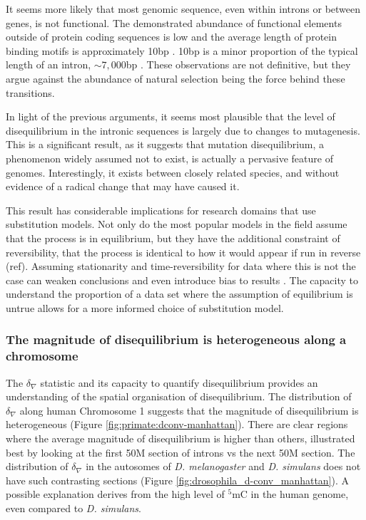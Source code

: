 It seems more likely that most genomic sequence, even within introns or between genes, is not functional. The demonstrated abundance of functional elements outside of protein coding sequences is low \citep{Graur2013OnENCODE} and the average length of protein binding motifs is approximately 10bp \citep{Stewart2012WhyLong}. 10bp is a minor proportion of the typical length of an intron, $\sim7,000$bp \citep{10.1093/database/baw153}. These observations are not definitive, but they argue against the abundance of natural selection being the force behind these transitions. 

In light of the previous arguments, it seems most plausible that the level of disequilibrium in the intronic sequences is largely due to changes to mutagenesis.  This is a significant result, as it suggests that mutation disequilibrium, a phenomenon widely assumed not to exist, is actually a pervasive feature of genomes. Interestingly, it exists between closely related species, and without evidence of a radical change that may have caused it. 

This result has considerable implications for research domains that use substitution models. Not only do the most popular models in the field assume that the process is in equilibrium, but they have the additional constraint of reversibility, that the process is identical to how it would appear if run in reverse (ref). Assuming stationarity and time-reversibility for data where this is not the case can weaken conclusions and even introduce bias to results \citep{Kaehler2015}. The capacity to understand the proportion of a data set where the assumption of equilibrium is untrue allows for a more informed choice of substitution model. 

\subsubsection{The magnitude of disequilibrium is heterogeneous along a chromosome }

The $\delta_\nabla$ statistic and its capacity to quantify disequilibrium provides an understanding of the spatial organisation of disequilibrium. The distribution of $\delta_\nabla$ along human Chromosome 1 suggests that the magnitude of disequilibrium is heterogeneous (Figure \ref{fig:primate:dconv-manhattan}). There are clear regions where the average magnitude of disequilibrium is higher than others, illustrated best by looking at the first 50M section of introns vs the next 50M section. The distribution of $\delta_\nabla$ in the autosomes of \textit{D. melanogaster} and \textit{D. simulans} does not have such contrasting sections (Figure \ref{fig:drosophila_d-conv_manhattan}). A possible explanation derives from the high level of $^5$mC in the human genome, even compared to \textit{D. simulans}. 

